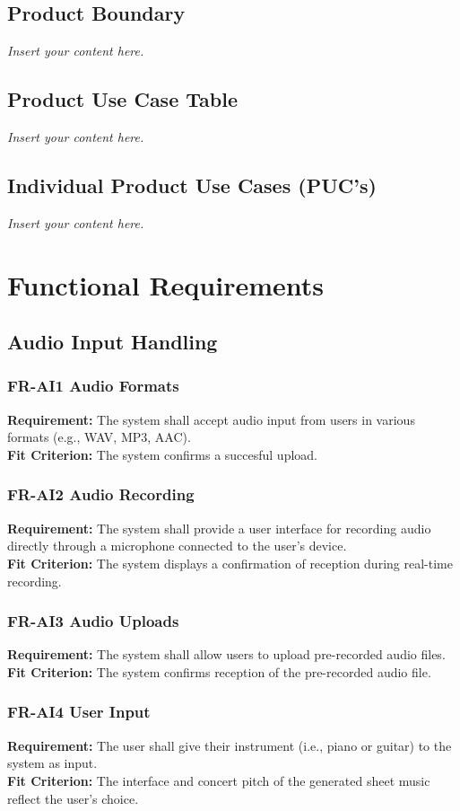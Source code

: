 \documentclass[12pt]{article}
\newcommand{\lips}{\textit{Insert your content here.}}
\begin{document}
\subsection{Product Boundary}
\lips
\subsection{Product Use Case Table}
\lips
\subsection{Individual Product Use Cases (PUC's)}
\lips

\section{Functional Requirements}
\subsection{Audio Input Handling}
\subsubsection*{FR-AI1 Audio Formats}
\textbf{Requirement:} The system shall accept audio input from users in various formats (e.g., WAV, MP3, AAC). \\
\textbf{Fit Criterion:} The system confirms a succesful upload.
\subsubsection*{FR-AI2 Audio Recording}
\textbf{Requirement:} The system shall provide a user interface for recording audio directly through a microphone connected to the user's device. \\
\textbf{Fit Criterion:} The system displays a confirmation of reception during real-time recording.
\subsubsection*{FR-AI3 Audio Uploads}
\textbf{Requirement:} The system shall allow users to upload pre-recorded audio files. \\
\textbf{Fit Criterion:} The system confirms reception of the pre-recorded audio file.
\subsubsection*{FR-AI4 User Input}
\textbf{Requirement:} The user shall give their instrument (i.e., piano or guitar) to the system as input. \\
\textbf{Fit Criterion:} The interface and concert pitch of the generated sheet music reflect the user's choice.
\end{document}
